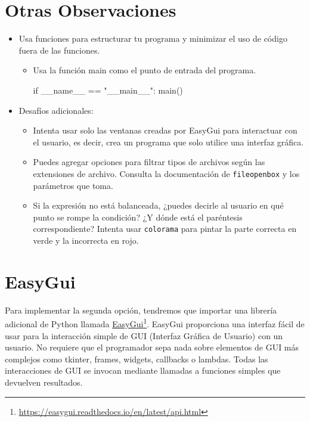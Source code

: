 \documentclass[10pt,a4paper]{article}
\begin{document}
\section{Otras Observaciones}

\begin{itemize}
\item Usa funciones para estructurar tu programa y minimizar el uso de código fuera de las funciones.
    \begin{itemize}
    \item Usa la función main como el punto de entrada del programa.
\begin{attachedlisting}[main]
if __name__ == "__main__":
    main()
\end{attachedlisting}
    \end{itemize}
\item Desafíos adicionales:
    \begin{itemize}
    \item Intenta usar solo las ventanas creadas por EasyGui para interactuar con el usuario, es decir, crea un programa que solo utilice una interfaz gráfica.
    \item Puedes agregar opciones para filtrar tipos de archivos según las extensiones de archivo. Consulta la documentación de \texttt{fileopenbox} y los parámetros que toma.
    \item Si la expresión no está balanceada, ¿puedes decirle al usuario en qué punto se rompe la condición? ¿Y dónde está el paréntesis correspondiente? Intenta usar \texttt{colorama} para pintar la parte correcta en verde y la incorrecta en rojo.
    \end{itemize}
\end{itemize}

\section{EasyGui}
\label{sec:easy}

Para implementar la segunda opción, tendremos que importar una librería adicional de Python llamada \href{https://easygui.readthedocs.io/en/latest/api.html}{EasyGui}\footnote{\href{https://easygui.readthedocs.io/en/latest/api.html}{https://easygui.readthedocs.io/en/latest/api.html}}. EasyGui proporciona una interfaz fácil de usar para la interacción simple de GUI (Interfaz Gráfica de Usuario) con un usuario. No requiere que el programador sepa nada sobre elementos de GUI más complejos como tkinter, frames, widgets, callbacks o lambdas. Todas las interacciones de GUI se invocan mediante llamadas a funciones simples que devuelven resultados.
\end{document}
